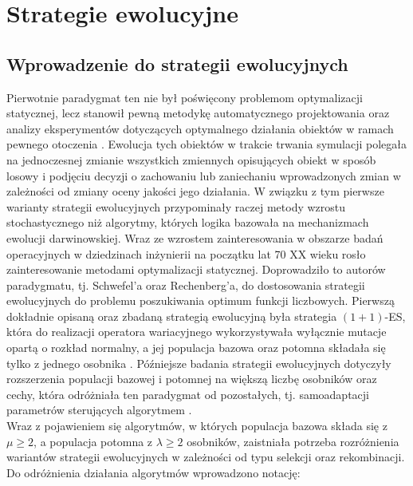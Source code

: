 \newpage

\section{Strategie ewolucyjne}
\subsection{Wprowadzenie do strategii ewolucyjnych}

    Pierwotnie paradygmat ten nie był poświęcony problemom optymalizacji statycznej, lecz stanowił pewną metodykę automatycznego projektowania oraz analizy eksperymentów dotyczących optymalnego działania obiektów w ramach pewnego otoczenia \cite{Rechenberg:1965}. 
    Ewolucja tych obiektów w trakcie trwania symulacji polegała na jednoczesnej zmianie wszystkich zmiennych opisujących obiekt w sposób losowy i podjęciu decyzji o zachowaniu lub zaniechaniu wprowadzonych zmian w zależności od zmiany oceny jakości jego działania. W związku z tym pierwsze warianty strategii ewolucyjnych przypominały raczej metody wzrostu stochastycznego niż algorytmy, których logika bazowała na mechanizmach ewolucji darwinowskiej. 
    Wraz ze wzrostem zainteresowania w obszarze badań operacyjnych w dziedzinach inżynierii na początku lat 70 XX wieku rosło zainteresowanie metodami optymalizacji statycznej. Doprowadziło to autorów paradygmatu, tj. Schwefel'a oraz Rechenberg'a, do dostosowania strategii ewolucyjnych do problemu poszukiwania optimum funkcji liczbowych. Pierwszą dokładnie opisaną oraz zbadaną strategią ewolucyjną była strategia $(1+1)$-ES, która do realizacji operatora wariacyjnego wykorzystywała wyłącznie mutacje opartą o rozkład normalny, a jej populacja bazowa oraz potomna składała się tylko z jednego osobnika \cite{Rechenberg:1973}. Późniejsze badania strategii ewolucyjnych dotyczyły rozszerzenia populacji bazowej i potomnej na większą liczbę osobników oraz cechy, która odróżniała ten paradygmat od pozostałych, tj. samoadaptacji parametrów sterujących  algorytmem \cite{Beyer:2002}. \\ 
    Wraz z pojawieniem się algorytmów, w których populacja bazowa składa się z $\mu \geq 2$, a populacja potomna z $\lambda \geq 2$ osobników, zaistniała potrzeba rozróżnienia wariantów strategii ewolucyjnych w zależności od typu selekcji oraz rekombinacji. Do odróżnienia działania algorytmów wprowadzono notację: 
    
